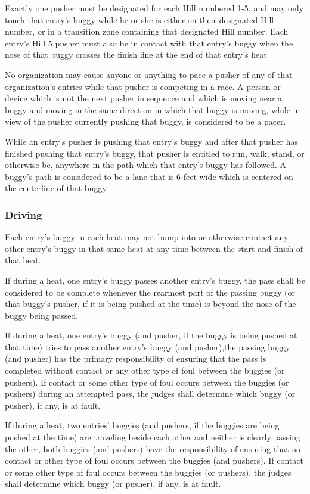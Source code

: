 	Exactly one pusher must be designated for each Hill numbered 1-5, and
	may only touch that entry's buggy while he or she is either on their
	designated Hill number, or in a transition zone containing that designated Hill
	number. Each entry's Hill 5 pusher must also be in contact with that entry's 
	buggy when the nose of that buggy crosses the finish line at the end of that 
	entry's heat.

	No organization may cause anyone or anything to pace a pusher of any of that
	organization's entries while that pusher is competing in a race. A person or
	device which is not the next pusher in sequence and which is moving near a
	buggy and moving in the same direction in which that buggy is moving, while in
	view of the pusher currently pushing that buggy, is considered to be a pacer.

	While an entry's pusher is pushing that entry's buggy and after that pusher has
	finished pushing that entry's buggy, that pusher is entitled to run, walk,
	stand, or otherwise be, anywhere in the path which that entry's buggy has
	followed. A buggy's path is considered to be a lane that is 6 feet wide which
	is centered on the centerline of that buggy.

\subsubsection{Driving}

	Each entry's buggy in each heat may not bump into or otherwise contact any
	other entry's buggy in that same heat at any time between the start and finish
	of that heat.

	If during a heat, one entry's buggy passes another entry's buggy, the pass
	shall be considered to be complete whenever the rearmost part of the passing
	buggy (or that buggy's pusher, if it is being pushed at the time) is beyond the
	nose of the buggy being passed.

	If during a heat, one entry's buggy (and pusher, if the buggy is being pushed
	at that time) tries to pass another entry's buggy (and pusher),the passing
	buggy (and pusher) has the primary responsibility of ensuring that the pass is
	completed without contact or any other type of foul between the buggies (or
	pushers). If contact or some other type of foul occurs between the buggies (or
	pushers) during an attempted pass, the judges shall determine which buggy (or
	pusher), if any, is at fault.

	If during a heat, two entries' buggies (and pushers, if the buggies are being
	pushed at the time) are traveling beside each other and neither is clearly
	passing the other, both buggies (and pushers) have the responsibility of
	ensuring that no contact or other type of foul occurs between the buggies (and
	pushers). If contact or some other type of foul occurs between the buggies (or
	pushers), the judges shall determine which buggy (or pusher), if any, is at
	fault.

